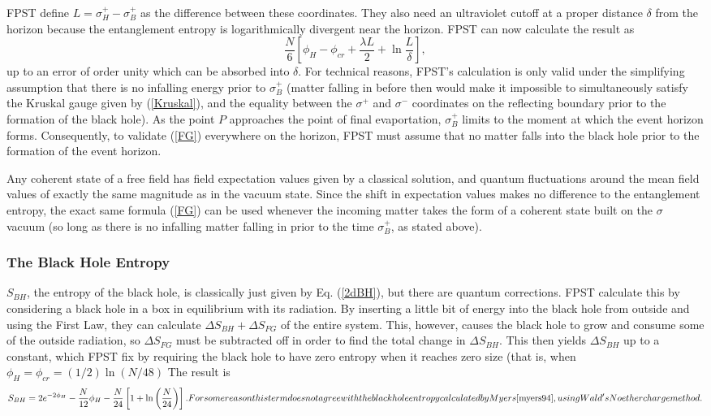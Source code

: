 \documentclass[12pt]{article}
\begin{document}
FPST define $L = \sigma^{+}_H - \sigma^{+}_B$ as the difference between these coordinates.  They also need an ultraviolet cutoff at a proper distance $\delta$ from the horizon because the entanglement entropy is logarithmically divergent near the horizon.  FPST can now calculate the result as
\begin{equation}\label{FG}
\frac{N}{6} \left[ \phi_{H} - \phi_{cr} + \frac{\lambda L}{2} + \ln \frac {L}{\delta} \right],
\end{equation}
up to an error of order unity which can be absorbed into $\delta$.  For technical reasons, FPST's calculation is only valid under the simplifying assumption that there is no infalling energy prior to $\sigma^{+}_B$ (matter falling in before then would make it impossible to simultaneously satisfy the Kruskal gauge given by (\ref{Kruskal}), and the equality between the $\sigma^{+}$ and $\sigma^{-}$ coordinates on the reflecting boundary prior to the formation of the black hole).  As the point $P$ approaches the point of final evaportation, $\sigma^{+}_B$ limits to the moment at which the event horizon forms.  Consequently, to validate (\ref{FG}) everywhere on the horizon, FPST must assume that no matter falls into the black hole prior to the formation of the event horizon.

Any coherent state of a free field has field expectation values given by a classical solution, and quantum fluctuations around the mean field values of exactly the same magnitude as in the vacuum state.  Since the shift in expectation values makes no difference to the entanglement entropy, the exact same formula (\ref{FG}) can be used whenever the incoming matter takes the form of a coherent state built on the $\sigma$ vacuum (so long as there is no infalling matter falling in prior to the time $\sigma^{+}_B$, as stated above).

\subsubsection{The Black Hole Entropy}

$S_{BH}$, the entropy of the black hole, is classically just given by Eq. (\ref{2dBH}), but there are quantum corrections.  FPST calculate this by considering a black hole in a box in equilibrium with its radiation.  By inserting a little bit of energy into the black hole from outside and using the First Law, they can calculate $\Delta S_{BH} + \Delta S_{FG}$ of the entire system.  This, however, causes the black hole to grow and consume some of the outside radiation, so $\Delta S_{FG}$ must be subtracted off in order to find the total change in $\Delta S_{BH}$.  This then yields $\Delta S_{BH}$ up to a constant, which FPST fix by requiring the black hole to have zero entropy when it reaches zero size (that is, when $\phi_{H} = \phi_{cr} = (1/2)\ln (N/48)$  The result is
\begin{equation}\label{BH}
S_{BH} = 2e^{-2\phi_H} - \frac{N}{12}\phi_H - 
\frac{N}{24}\left[ 1 + \ln \left( \frac{N}{24} \right) \right].\footnote{For some reason this term does not agree with the black hole entropy calculated by Myers \cite{myers94}, using Wald's Noether charge method.}
\end{equation}
\end{document}
